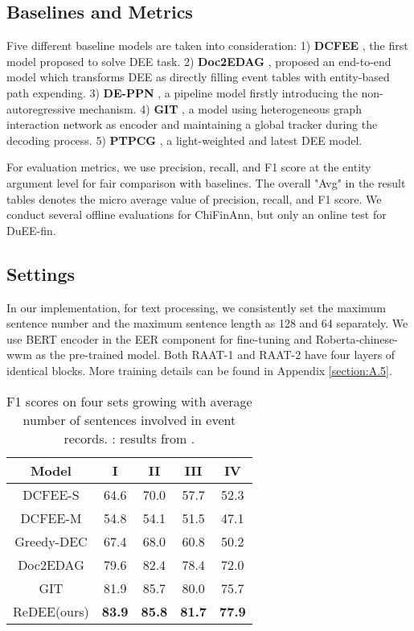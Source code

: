 \documentclass[11pt]{article}
\begin{document}
\subsection{Baselines and Metrics}
Five different baseline models are taken into consideration: 1) \textbf{DCFEE} \cite{DCFEE}, the first model proposed to solve DEE task. 2) \textbf{Doc2EDAG} \cite{Doc2EDAG}, proposed an end-to-end model which transforms DEE as directly filling event tables with entity-based path expending. 3) \textbf{DE-PPN} \cite{DE-PPN}, a pipeline model firstly introducing the non-autoregressive mechanism. 4) \textbf{GIT} \cite{GIT}, a model using heterogeneous graph interaction network as encoder and maintaining a global tracker during the decoding process. 5) \textbf{PTPCG} \cite{PTPCG}, a light-weighted and latest DEE model. 

For evaluation metrics, we use precision, recall, and F1 score at the entity argument level for fair comparison with baselines. The overall "Avg" in the result tables denotes the micro average value of precision, recall, and F1 score. We conduct several offline evaluations for ChiFinAnn, but only an online test for DuEE-fin. 


\subsection{Settings}

In our implementation, for text processing, we consistently set the maximum sentence number and the maximum sentence length as 128 and 64 separately. We use BERT encoder in the EER component for fine-tuning and Roberta-chinese-wwm \cite{prtrainedModel} as the pre-trained model. Both RAAT-1 and RAAT-2 have four layers of identical blocks. More training details can be found in Appendix \ref{section:A.5}.
\begin{table}
\centering\small
\begin{tabular}{c|c|c|c|c}
\hline
\hline
\textbf{Model} & \textbf{I} & \textbf{II} & \textbf{III} & \textbf{IV} \\ 
\hline
DCFEE-S & 64.6 & 70.0 & 57.7 & 52.3 \\
DCFEE-M & 54.8 & 54.1 & 51.5 & 47.1 \\
Greedy-DEC & 67.4 & 68.0 & 60.8 & 50.2 \\
Doc2EDAG & 79.6 & 82.4 & 78.4 & 72.0 \\
GIT & 81.9 & 85.7 & 80.0 & 75.7 \\
\hline
ReDEE(ours) & \textbf{83.9} & \textbf{85.8} & \textbf{81.7} & \textbf{77.9} \\
\hline
\hline
\end{tabular}
\caption{F1 scores on four sets growing with average number of sentences involved in event records. : results from \cite{GIT}.}
\label{tab:across-sentence}
\end{table}
\end{document}
